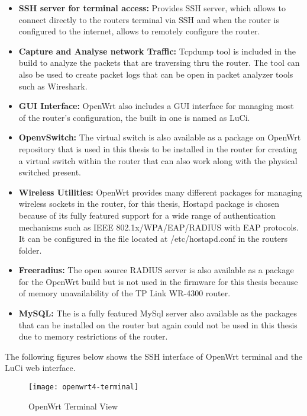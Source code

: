 \begin{itemize}
	\item \textbf{SSH server for terminal access:} Provides SSH server, which allows to connect directly to the routers terminal via SSH and when the router is configured to the internet, allows to remotely configure the router. 
	\item \textbf{Capture and Analyse network Traffic:} Tcpdump tool is included in the build to analyze the packets that are traversing thru the router. The tool can also be used to create packet logs that can be open in packet analyzer tools such as Wireshark.
	\item \textbf{GUI Interface:} OpenWrt also includes a GUI interface for managing most of the router’s configuration, the built in one is named as LuCi.
	\item \textbf{OpenvSwitch:} The virtual switch is also available as a package on OpenWrt repository that is used in this thesis to be installed in the router for creating a virtual switch within the router that can also work along with the physical switched present.
	\item \textbf{Wireless Utilities:} OpenWrt provides many different packages for managing wireless sockets in the router, for this thesis, Hostapd package is chosen because of its fully featured support for a wide range of authentication mechanisms such as IEEE 802.1x/WPA/EAP/RADIUS with EAP protocols. It can be configured in the file located at /etc/hostapd.conf in the routers folder.
	\item \textbf{Freeradius:} The open source RADIUS server is also available as a package for the OpenWrt build but is not used in the firmware for this thesis because of memory unavailability of the TP Link WR-4300 router.
	\item \textbf{MySQL:} The is a fully featured MySql server also available as the packages that can be installed on the router but again could not be used in this thesis due to memory restrictions of the router.
	
\end{itemize}
The following figures below shows the SSH interface of OpenWrt terminal and the LuCi web interface.
\begin{figure}[H]
	\centering
	\texttt{[image: openwrt4-terminal]}
	\caption{OpenWrt Terminal View \cite{openwrt_terminal_img}} \label{fig:OpenWrt_terminal}
	\vspace{-10pt}
\end{figure}

